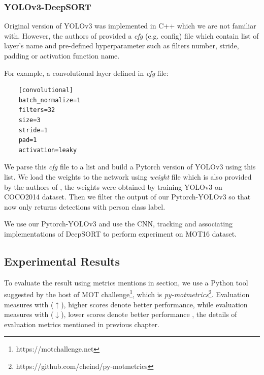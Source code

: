 \subsubsection{YOLOv3-DeepSORT}
\hspace{0.45cm}Original version of YOLOv3 was implemented in C++ which we are not familiar with. However, the authors of \cite{yolov3} provided a \textit{cfg} (e.g. config) file which contain list of layer's name and pre-defined hyperparameter 
such as filters number, stride, padding or activation function name.\par For example, a convolutional layer defined in \textit{cfg} file:
\begin{lstlisting}
    [convolutional]
    batch_normalize=1
    filters=32
    size=3
    stride=1
    pad=1
    activation=leaky
\end{lstlisting}\par
We parse this \textit{cfg} file to a list and build a Pytorch version of YOLOv3 using this list. We load the weights to the network using \textit{weight} file which is also provided by the authors of \cite{yolov3},
 the weights were obtained by training YOLOv3 on COCO2014 dataset. Then we filter the output of our Pytorch-YOLOv3 so that now only returns detections with person class label.\par
We use our Pytorch-YOLOv3 and use the CNN, tracking and associating implementations of DeepSORT\cite{Wojke2017simple} to perform experiment on MOT16 dataset.

\subsection{Experimental Results}
\hspace{0.45cm}To evaluate the result using metrics mentions in section, we use a Python tool suggested by the host of MOT challenge\footnote{https://motchallenge.net}, which is \textit{py-motmetrics}\footnote{https://github.com/cheind/py-motmetrics}.
Evaluation measures with ($\uparrow$), higher scores denote better performance, while evaluation measures with ($\downarrow$), lower scores denote better performance \cite{sort}, the details of evaluation metrics mentioned in previous chapter.\par
